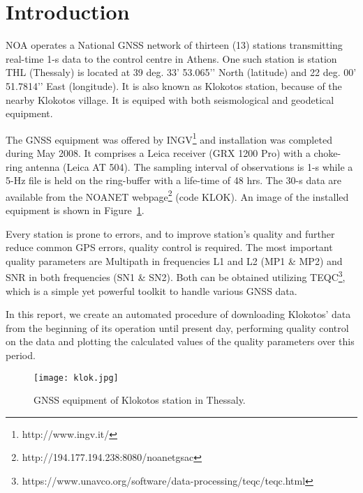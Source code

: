 \documentclass[
12pt, %
a4paper, %
oneside, %
headinclude,footinclude, %
BCOR5mm, %
]{article}
\begin{document}
\pagestyle{scrheadings} %


\section{Introduction}

NOA operates a National GNSS network of thirteen (13) stations transmitting real-time 1-s data to the control centre in Athens. One such station is station THL (Thessaly) is located at 39 deg. 33’ 53.065’’ North (latitude) and 22 deg. 00’ 51.7814’’ East (longitude). It is also known as Klokotos station, because of the nearby Klokotos village. It is equiped with both seismological and geodetical equipment.

The GNSS equipment was offered by INGV\footnote{http://www.ingv.it/} and installation was completed during May 2008. It comprises a Leica receiver (GRX 1200 Pro) with a choke-ring antenna (Leica AT 504). The sampling interval of observations is 1-s while a 5-Hz file is held on the ring-buffer with a life-time of 48 hrs. The 30-s data are available from the NOANET webpage\footnote{http://194.177.194.238:8080/noanetgsac} (code KLOK). An image of the installed equipment is shown in Figure~\ref{fig:klok}.

Every station is prone to errors, and to improve station's quality and further reduce common GPS errors, quality control is required. The most important quality parameters are Multipath in frequencies L1 and L2 (MP1 \& MP2) and SNR in both frequencies (SN1 \& SN2). Both can  be obtained  utilizing TEQC\footnote{https://www.unavco.org/software/data-processing/teqc/teqc.html}, which is a simple yet powerful toolkit to handle various GNSS data.

In this report, we create an automated procedure of downloading Klokotos' data from the beginning of its operation until present day, performing quality control on the data and plotting the calculated values of the quality parameters over this period.

\begin{figure}[h!]
\centering
\texttt{[image: klok.jpg]}
\caption[text]{GNSS equipment of Klokotos station in Thessaly.}
\label{fig:klok}
\end{figure}
\end{document}
